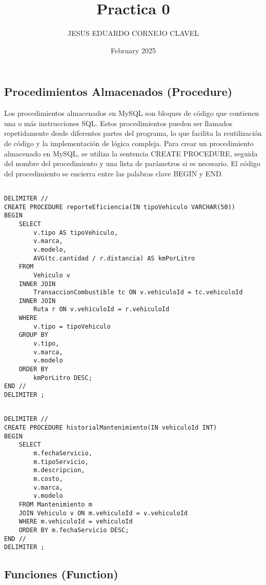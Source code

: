 \documentclass{article}
\title{Practica 0}
\author{JESUS EDUARDO CORNEJO CLAVEL}
\date{February 2025}
\begin{document}
\maketitle

\subsection{Procedimientos Almacenados (Procedure)}

\textnormal{Los procedimientos almacenados en MySQL son bloques de código que contienen una o más instrucciones SQL. Estos procedimientos pueden ser llamados repetidamente desde diferentes partes del programa, lo que facilita la reutilización de código y la implementación de lógica compleja. Para crear un procedimiento almacenado en MySQL, se utiliza la sentencia CREATE PROCEDURE, seguida del nombre del procedimiento y una lista de parámetros si es necesario. El código del procedimiento se encierra entre las palabras clave BEGIN y END.}

\begin{lstlisting}[style=sqlstyle]

DELIMITER // 
CREATE PROCEDURE reporteEficiencia(IN tipoVehiculo VARCHAR(50))
BEGIN
    SELECT 
        v.tipo AS tipoVehiculo, 
        v.marca, 
        v.modelo, 
        AVG(tc.cantidad / r.distancia) AS kmPorLitro
    FROM 
        Vehiculo v 
    INNER JOIN 
        TransaccionCombustible tc ON v.vehiculoId = tc.vehiculoId
    INNER JOIN 
        Ruta r ON v.vehiculoId = r.vehiculoId
    WHERE 
        v.tipo = tipoVehiculo
    GROUP BY 
        v.tipo, 
        v.marca, 
        v.modelo
    ORDER BY 
        kmPorLitro DESC;
END // 
DELIMITER ;


\end{lstlisting}

\begin{lstlisting}[style=sqlstyle]
    DELIMITER //
CREATE PROCEDURE historialMantenimiento(IN vehiculoId INT)
BEGIN
    SELECT 
        m.fechaServicio,
        m.tipoServicio,
        m.descripcion,
        m.costo,
        v.marca,
        v.modelo
    FROM Mantenimiento m
    JOIN Vehiculo v ON m.vehiculoId = v.vehiculoId
    WHERE m.vehiculoId = vehiculoId
    ORDER BY m.fechaServicio DESC;
END //
DELIMITER ;

\end{lstlisting}

\subsection{Funciones (Function)}
\end{document}
